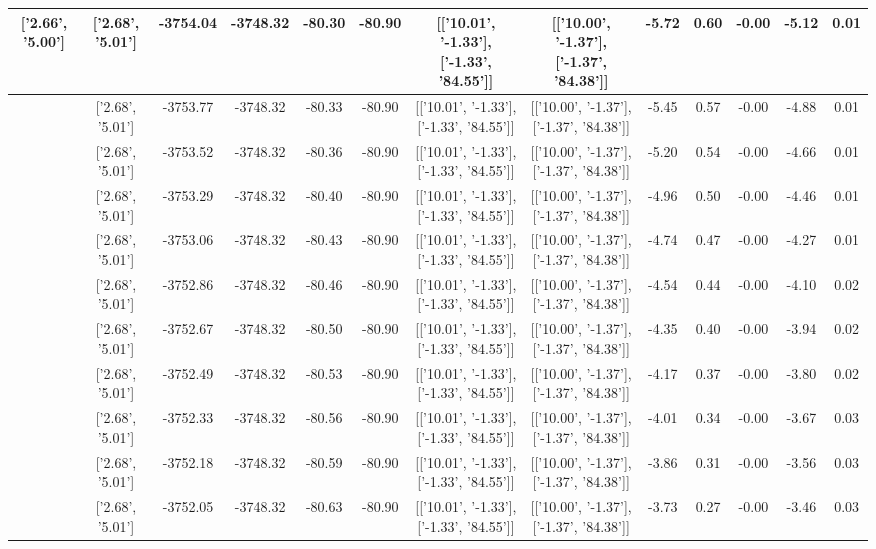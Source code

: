\begin{table}[htbp]
\begin{adjustbox}{angle=90}
\begin{tabular}{|c|c|c|c|c|c|c|c|c|c|c|c|c|}
 ['2.66', '5.00'] & ['2.68', '5.01'] & -3754.04 & -3748.32 & -80.30 & -80.90 & [['10.01', '-1.33'], ['-1.33', '84.55']] & [['10.00', '-1.37'], ['-1.37', '84.38']] & -5.72 & 0.60 & -0.00 & -5.12 & 0.01\\ \hline
 ['2.66', '5.00'] & ['2.68', '5.01'] & -3753.77 & -3748.32 & -80.33 & -80.90 & [['10.01', '-1.33'], ['-1.33', '84.55']] & [['10.00', '-1.37'], ['-1.37', '84.38']] & -5.45 & 0.57 & -0.00 & -4.88 & 0.01\\ \hline
 ['2.66', '5.00'] & ['2.68', '5.01'] & -3753.52 & -3748.32 & -80.36 & -80.90 & [['10.01', '-1.33'], ['-1.33', '84.55']] & [['10.00', '-1.37'], ['-1.37', '84.38']] & -5.20 & 0.54 & -0.00 & -4.66 & 0.01\\ \hline
 ['2.66', '5.00'] & ['2.68', '5.01'] & -3753.29 & -3748.32 & -80.40 & -80.90 & [['10.01', '-1.33'], ['-1.33', '84.55']] & [['10.00', '-1.37'], ['-1.37', '84.38']] & -4.96 & 0.50 & -0.00 & -4.46 & 0.01\\ \hline
 ['2.67', '5.00'] & ['2.68', '5.01'] & -3753.06 & -3748.32 & -80.43 & -80.90 & [['10.01', '-1.33'], ['-1.33', '84.55']] & [['10.00', '-1.37'], ['-1.37', '84.38']] & -4.74 & 0.47 & -0.00 & -4.27 & 0.01\\ \hline
 ['2.67', '5.00'] & ['2.68', '5.01'] & -3752.86 & -3748.32 & -80.46 & -80.90 & [['10.01', '-1.33'], ['-1.33', '84.55']] & [['10.00', '-1.37'], ['-1.37', '84.38']] & -4.54 & 0.44 & -0.00 & -4.10 & 0.02\\ \hline
 ['2.67', '5.00'] & ['2.68', '5.01'] & -3752.67 & -3748.32 & -80.50 & -80.90 & [['10.01', '-1.33'], ['-1.33', '84.55']] & [['10.00', '-1.37'], ['-1.37', '84.38']] & -4.35 & 0.40 & -0.00 & -3.94 & 0.02\\ \hline
 ['2.67', '5.00'] & ['2.68', '5.01'] & -3752.49 & -3748.32 & -80.53 & -80.90 & [['10.01', '-1.33'], ['-1.33', '84.55']] & [['10.00', '-1.37'], ['-1.37', '84.38']] & -4.17 & 0.37 & -0.00 & -3.80 & 0.02\\ \hline
 ['2.67', '5.00'] & ['2.68', '5.01'] & -3752.33 & -3748.32 & -80.56 & -80.90 & [['10.01', '-1.33'], ['-1.33', '84.55']] & [['10.00', '-1.37'], ['-1.37', '84.38']] & -4.01 & 0.34 & -0.00 & -3.67 & 0.03\\ \hline
 ['2.67', '5.00'] & ['2.68', '5.01'] & -3752.18 & -3748.32 & -80.59 & -80.90 & [['10.01', '-1.33'], ['-1.33', '84.55']] & [['10.00', '-1.37'], ['-1.37', '84.38']] & -3.86 & 0.31 & -0.00 & -3.56 & 0.03\\ \hline
 ['2.67', '5.00'] & ['2.68', '5.01'] & -3752.05 & -3748.32 & -80.63 & -80.90 & [['10.01', '-1.33'], ['-1.33', '84.55']] & [['10.00', '-1.37'], ['-1.37', '84.38']] & -3.73 & 0.27 & -0.00 & -3.46 & 0.03\\ \hline

\end{tabular}
\end{adjustbox}
\end{table}
